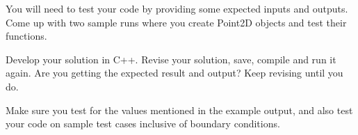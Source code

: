 \begin{multipart}
You will need to test your code by providing some expected inputs and outputs. Come up with two sample runs where you create Point2D objects and test their functions.

\end{multipart}

\vspace{1.5cm}

\begin{multipart}
Develop your solution in C++. Revise your solution, save, compile and run it again. Are you getting the expected result and output? Keep revising until you do.

Make sure you test for the values mentioned in the example output, and also test your code on sample test cases inclusive of boundary conditions.
\end{multipart}

